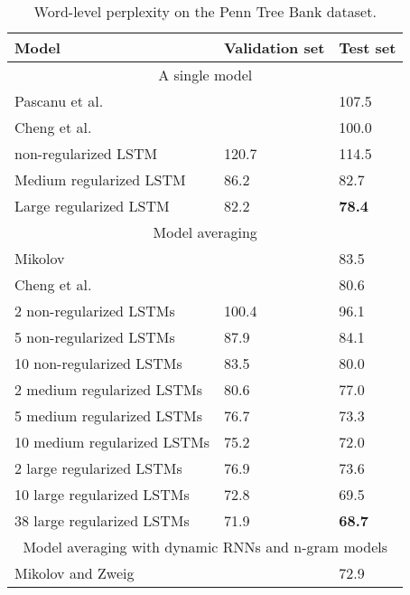 \documentclass[twoside,11pt,a4paper]{article}
\begin{document}
	\begin{table}[t]
		\small
		\centering
		\renewcommand{\arraystretch}{1.15}
		\begin{tabular}{lll}
			\hline
			Model & Validation set & Test set \\
			\hline
			\multicolumn{3}{c}{A single model} \\
			\hline
			Pascanu et al.~\cite{pascanu2013construct} & & 107.5 \\
			Cheng et al.~\cite{chenglanguage} & & 100.0 \\
			non-regularized LSTM & 120.7 & 114.5 \\
			Medium regularized LSTM & 86.2 & 82.7 \\
			Large regularized LSTM & 82.2 & {\bf 78.4} \\
			\hline
			\multicolumn{3}{c}{Model averaging} \\
			\hline
			Mikolov \cite{mikolov2012statistical} & & 83.5 \\
			Cheng et al.~\cite{chenglanguage} & & 80.6 \\
			2 non-regularized LSTMs & 100.4 & 96.1 \\
			5 non-regularized LSTMs & 87.9 & 84.1 \\
			10 non-regularized LSTMs & 83.5 & 80.0 \\
			2 medium regularized LSTMs & 80.6 & 77.0 \\
			5 medium regularized LSTMs & 76.7 & 73.3 \\
			10 medium regularized LSTMs & 75.2 & 72.0 \\
			2 large regularized LSTMs & 76.9 & 73.6 \\
			10 large regularized LSTMs & 72.8 & 69.5 \\
			38 large regularized LSTMs & 71.9 & {\bf 68.7} \\
			\hline
			\multicolumn{3}{c}{Model averaging with dynamic RNNs and n-gram models} \\
			\hline
			Mikolov and Zweig \cite{mikolov2012context} & & 72.9 \\
			\hline
		\end{tabular}
		\caption{Word-level perplexity on the Penn Tree Bank dataset.}
		\label{tab:ptb}
	\end{table}
	
\end{document}
